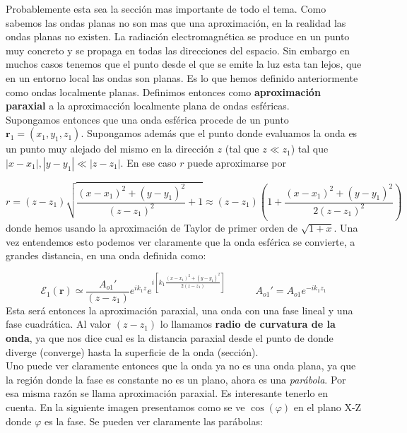 \documentclass[12pt,a4paper]{book}
\numberwithin{equation}{section}
\numberwithin{figure}{section}
\newcommand{\tquad}{\quad \quad \quad}
\newcommand{\parentesis}[1]{\left( #1  \right)}
\newcommand{\ccorchetes}[1]{\left[ #1  \right]}
\newcommand{\1}{_{(1)}}
\newcommand{\2}{_{(2)}}
\newcommand{\rn}{\mathbf{r}}
\theoremstyle{definition}
\begin{document}
Probablemente esta sea la sección mas importante de todo el tema. Como sabemos las ondas planas no son mas que una aproximación, en la realidad las ondas planas no existen. La radiación electromagnética se produce en un punto muy concreto y se propaga en todas las direcciones del espacio. Sin embargo en muchos casos tenemos que el punto desde el que se emite la luz esta tan lejos, que en un entorno local las ondas son planas. Es lo que hemos definido anteriormente como ondas localmente planas. Definimos entonces como \textbf{aproximación paraxial} a la aproximacción localmente plana de ondas esféricas. \\ 

Supongamos entonces que una onda esférica procede de un punto $\rn_1 = (x_1,y_1,z_1)$. Supongamos además que el punto donde evaluamos la onda es   un punto muy alejado del mismo en la dirección $z$ (tal que $z \ll z_1$) tal que $|x-x_1|,|y-y_1| \ll |z-z_1|$. En ese caso $r$ puede aproximarse por

\begin{equation}
r = (z-z_1) \sqrt{\frac{(x-x_1)^2+ (y-y_1)^2}{(z-z_1)^2} + 1} \approx(z-z_1) \parentesis{1+\dfrac{(x-x_1)^2 + (y-y_1)^2}{2 (z-z_1)^2}}
\end{equation}
donde hemos usando la aproximación de Taylor de primer orden de $\sqrt{1+x}$. Una vez entendemos esto podemos ver claramente que la onda esférica se convierte, a grandes distancia, en una onda definida como:

\begin{equation}
\mathcal{E}_1 (\rn) \simeq \dfrac{A_{o1}'}{(z-z_1)} e^{i k_1 z} e^{i \ccorchetes{k_1 \frac{(x-x_1)^2+(y-y_1)^2}{2 (z-z_1)}}} \tquad A_{o1}' = A_{o1} e^{- i k_1 z_1}
\end{equation}
Esta será entonces la aproximación paraxial, una onda con una fase lineal y una fase cuadrática. Al valor $(z-z_1)$ lo llamamos \textbf{radio de curvatura de la onda}, ya que nos dice cual es la distancia paraxial desde el punto de donde diverge (converge) hasta la superficie de la onda (sección). \\

Uno puede ver claramente entonces que la onda ya no es una onda plana, ya que la región donde la fase es constante no es un plano, ahora es una \textit{parábola}. Por esa misma razón se llama aproximación paraxial. Es interesante tenerlo en cuenta. En la siguiente imagen presentamos como se ve $\cos (\varphi)$ en el plano X-Z donde $\varphi$ es la fase. Se pueden ver claramente las parábolas:
\end{document}
